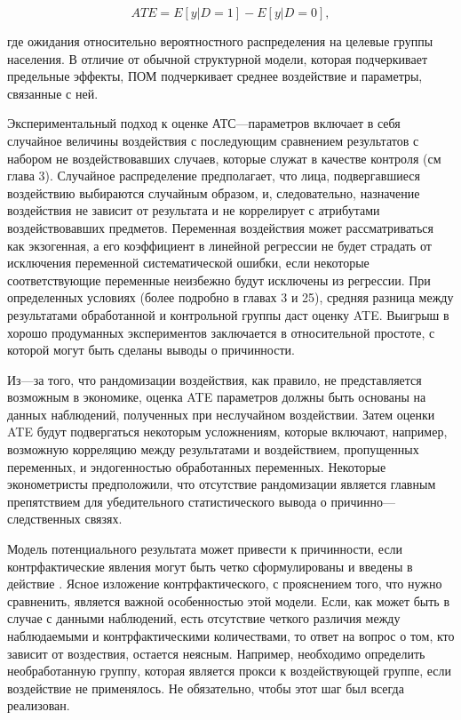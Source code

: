 \begin{equation}
ATE=E[y|D=1]-E[y|D=0],
\end{equation}

где ожидания относительно вероятностного распределения на целевые группы населения. В отличие от обычной структурной модели, которая подчеркивает предельные эффекты, ПОМ подчеркивает среднее воздействие и параметры, связанные с ней.


	Экспериментальный подход к оценке АТС---параметров включает в себя случайное величины воздействия с последующим сравнением результатов с набором не воздействовавших случаев, которые служат в качестве контроля (см глава 3). Случайное распределение предполагает, что лица, подвергавшиеся воздействию выбираются случайным образом, и, следовательно, назначение воздействия не зависит от результата и не коррелирует с атрибутами воздействовавших предметов. Переменная воздействия может рассматриваться как экзогенная, а его коэффициент в линейной регрессии не будет страдать от исключения переменной систематической ошибки,  если некоторые соответствующие переменные неизбежно будут исключены из регрессии. При определенных условиях (более подробно в главах 3 и 25), средняя разница между результатами обработанной и контрольной группы даст оценку ATE. Выигрыш в хорошо продуманных экспериментов заключается в относительной простоте, с которой могут быть сделаны выводы о причинности. 
	
	
	Из---за того, что  рандомизации воздействия, как правило, не представляется возможным в экономике, оценка ATE параметров должны быть основаны на данных наблюдений, полученных при неслучайном воздействии. Затем оценки ATE будут подвергаться некоторым усложнениям, которые включают, например, возможную корреляцию между результатами и воздействием, пропущенных переменных, и эндогенностью обработанных переменных. Некоторые эконометристы предположили, что отсутствие рандомизации является главным препятствием для убедительного статистического вывода о причинно---следственных связях.
	
	
	Модель потенциального результата может привести к причинности, если контрфактические явления могут быть четко сформулированы и введены в действие . Ясное изложение контрфактического, с прояснением того, что нужно сравненить, является важной особенностью этой модели. Если, как может быть в случае с данными наблюдений, есть отсутствие четкого различия между наблюдаемыми и контрфактическими количествами, то ответ на вопрос о том, кто зависит от воздествия, остается неясным. Например, необходимо определить необработанную группу, которая является прокси к воздействующей группе, если воздействие не применялось. Не обязательно, чтобы этот шаг был всегда реализован.
	
